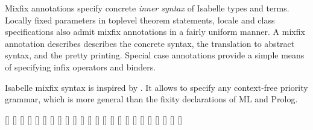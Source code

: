 \begin{isabellebody}
\begin{isamarkuptext}
\begin{description}
  \end{description}%
\end{isamarkuptext}%
\isamarkuptrue%
%
\isamarkuptrue%
%
\begin{isamarkuptext}%
Mixfix annotations specify concrete \emph{inner syntax} of
  Isabelle types and terms.  Locally fixed parameters in toplevel
  theorem statements, locale and class specifications also admit
  mixfix annotations in a fairly uniform manner.  A mixfix annotation
  describes describes the concrete syntax, the translation to abstract
  syntax, and the pretty printing.  Special case annotations provide a
  simple means of specifying infix operators and binders.

  Isabelle mixfix syntax is inspired by {\OBJ} \cite{OBJ}.  It allows
  to specify any context-free priority grammar, which is more general
  than the fixity declarations of ML and Prolog.

  \begin{railoutput}
[]
[]
[]
\rail@end
{}
[]
\rail@bar
{}[]
[]
\rail@endbar
{}[]
\rail@end
{}
\rail@bar
{}[]
\rail@bar
{}
[]
\rail@endbar
\rail@bar
{}
[]
\rail@endbar
{}
\rail@bar
{}[]
[]
[]
\rail@endbar
{}[]
[]
[]
[]
\rail@bar
{}
[]
\rail@endbar
{}[]
\rail@endbar
\rail@end
{}
[]
\rail@end
{}
[]
\rail@plus
{}[]
[]
\rail@endplus
{}[]
\rail@end
\end{railoutput}



\end{isamarkuptext}
\end{isabellebody}
